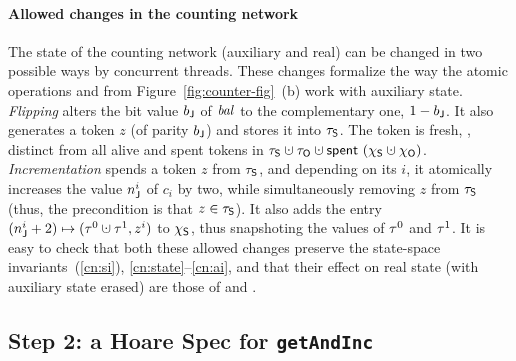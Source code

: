 

%
%
%

\paragraph{Allowed changes in the counting network}
\label{sec:count-netw-prot}


The state of the counting network (auxiliary and real) can be changed
in two possible ways by concurrent threads. These changes formalize
the way the atomic operations  and  from
Figure~\ref{fig:counter-fig}~(b) work with auxiliary state.
%
\emph{Flipping} alters the bit value $b_{\mathsf{J}}$ of $\mathit{bal}$ to the
complementary one, $1 - b_{\mathsf{J}}$.
%
It also generates a token $z$ (of parity $b_{\mathsf{J}}$) and stores it
into $\tau_{\mathsf{S}}$. The token is fresh, \ie, distinct from all alive and
spent tokens in $\tkns \hunion \tkno \hunion{\Tomb~(\hists
  \hunion \histo)}$.
%
\emph{Incrementation} spends a token $z$ from $\tau_{\mathsf{S}}$, and depending
on its $i$, it atomically increases the value $n^i_{\mathsf{J}}$ of $c_i$ by
two, while simultaneously removing $z$ from $\tau_{\mathsf{S}}$ (thus, the
precondition is that $z \in \tau_{\mathsf{S}}$). It also adds the entry
$(n^i_\joint + 2) \hpts (\tkn^0 \hunion \tkn^1, z^i)$ to $\chi_{\mathsf{S}}$,
thus snapshoting the values of $\tau^0$ and $\tau^1$.
%
It is easy to check that both these allowed changes preserve the
state-space invariants~(\ref{cn:si}), \ref{cn:state}--\ref{cn:ai}, and
that their effect on real state (with auxiliary state erased) are
those of  and .

\subsection{Step 2: a Hoare Spec for \texttt{getAndInc}}
\label{sec:spec-gaa}

